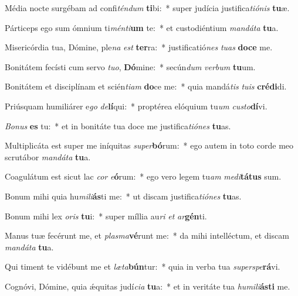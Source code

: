 \item Média nocte surgébam ad confi\textit{tén}\textit{dum} \textbf{ti}bi:~* super judícia justifica\textit{ti}\textit{ó}\textit{nis} \textbf{tu}æ.
\item Párticeps ego sum ómnium ti\textit{mén}\textit{ti}\textbf{um} te:~* et custodiéntium \textit{man}\textit{dá}\textit{ta} \textbf{tu}a.
\item Misericórdia tua, Dómine, ple\textit{na} \textit{est} \textbf{ter}ra:~* justificatió\textit{nes} \textit{tu}\textit{as} \textbf{do}\textbf{ce} me.
\item Bonitátem fecísti cum servo \textit{tu}\textit{o}, \textbf{Dó}mine:~* secún\textit{dum} \textit{ver}\textit{bum} \textbf{tu}um.
\item Bonitátem et disciplínam et scién\textit{ti}\textit{am} \textbf{do}ce me:~* quia mandá\textit{tis} \textit{tu}\textit{is} \textbf{cré}\textbf{di}di.
\item Priúsquam humiliárer e\textit{go} \textit{de}\textbf{lí}qui:~* proptérea elóquium tu\textit{um} \textit{cus}\textit{to}\textbf{dí}vi.
\item \textit{Bo}\textit{nus} \textbf{es} tu:~* et in bonitáte tua doce me justifica\textit{ti}\textit{ó}\textit{nes} \textbf{tu}as.
\item Multiplicáta est super me iníquitas \textit{su}\textit{per}\textbf{bó}rum:~* ego autem in toto corde meo scrutábor \textit{man}\textit{dá}\textit{ta} \textbf{tu}a.
\item Coagulátum est sicut lac \textit{cor} \textit{e}\textbf{ó}rum:~* ego vero legem tu\textit{am} \textit{me}\textit{di}\textbf{tá}\textbf{tus} sum.
\item Bonum mihi quia hu\textit{mi}\textit{li}\textbf{ás}ti me:~* ut discam justifica\textit{ti}\textit{ó}\textit{nes} \textbf{tu}as.
\item Bonum mihi lex \textit{o}\textit{ris} \textbf{tu}i:~* super míllia au\textit{ri} \textit{et} \textit{ar}\textbf{gén}ti.
\item Manus tuæ fecérunt me, et \textit{plas}\textit{ma}\textbf{vé}runt me:~* da mihi intelléctum, et discam \textit{man}\textit{dá}\textit{ta} \textbf{tu}a.
\item Qui timent te vidébunt me et \textit{læ}\textit{ta}\textbf{bún}tur:~* quia in verba tua \textit{su}\textit{per}\textit{spe}\textbf{rá}vi.
\item Cognóvi, Dómine, quia ǽquitas judí\textit{ci}\textit{a} \textbf{tu}a:~* et in veritáte tua \textit{hu}\textit{mi}\textit{li}\textbf{ás}\textbf{ti} me.
